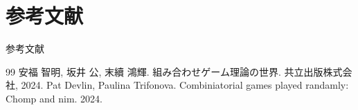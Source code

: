 \section{参考文献}
\begin{frame}{参考文献}
    \begin{thebibliography}{99}
         安福 智明, 坂井 公, 末續 鴻輝. 組み合わせゲーム理論の世界. 共立出版株式会社, 2024.
         Pat Devlin, Paulina Trifonova. Combiniatorial games played randamly: Chomp and nim. 2024.
    \end{thebibliography}
\end{frame}